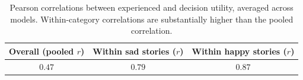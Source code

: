 \begin{table}
\centering
\small
\caption{Pearson correlations between experienced and decision utility, averaged across models. Within-category correlations are substantially higher than the pooled correlation.}
\begin{tabular}{@{}ccc@{}}
\toprule
\shortstack{Overall\\(pooled $r$)} & \shortstack{Within sad\\stories ($r$)} & \shortstack{Within happy\\stories ($r$)} \\
\midrule
$0.47$ & $0.79$ & $0.87$ \\
\bottomrule
\end{tabular}
\label{tab:within-category-corr}
\end{table}





